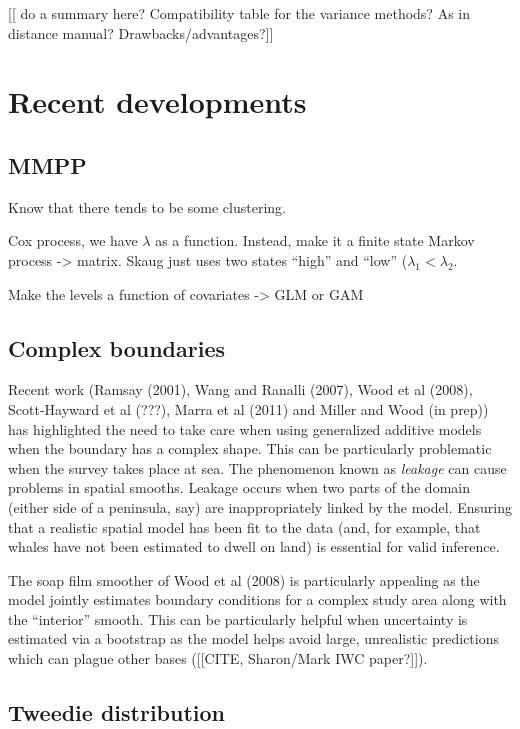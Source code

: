 \documentclass[useAMS,referee]{biom}
\begin{document}
[[ do a summary here? Compatibility table for the variance methods? As in distance manual? Drawbacks/advantages?]]


\section{Recent developments}


\subsection{MMPP}

Know that there tends to be some clustering.

Cox process, we have $\lambda$ as a function. 
Instead, make it a finite state Markov process -> matrix.
Skaug just uses two states ``high'' and ``low'' ($\lambda_1< \lambda_2$.

Make the levels a function of covariates -> GLM or GAM




\subsection{Complex boundaries}
\label{s:leakage}

Recent work (Ramsay (2001), Wang and Ranalli (2007), Wood et al (2008), Scott-Hayward et al (???), Marra et al (2011) and Miller and Wood (in prep)) has highlighted the need to take care when using generalized additive models when the boundary has a complex shape. This can be particularly problematic when the survey takes place at sea. The phenomenon known as \textit{leakage} can cause problems in spatial smooths. Leakage occurs when two parts of the domain (either side of a peninsula, say) are inappropriately linked by the model. Ensuring that a realistic spatial model has been fit to the data (and, for example, that whales have not been estimated to dwell on land) is essential for valid inference.

The soap film smoother of Wood et al (2008) is particularly appealing as the model jointly estimates boundary conditions for a complex study area along with the ``interior'' smooth. This can be particularly helpful when uncertainty is estimated via a bootstrap as the model helps avoid large, unrealistic predictions which can plague other bases ([[CITE, Sharon/Mark IWC paper?]]).

\subsection{Tweedie distribution}
\label{s:Tweedie}
\end{document}
